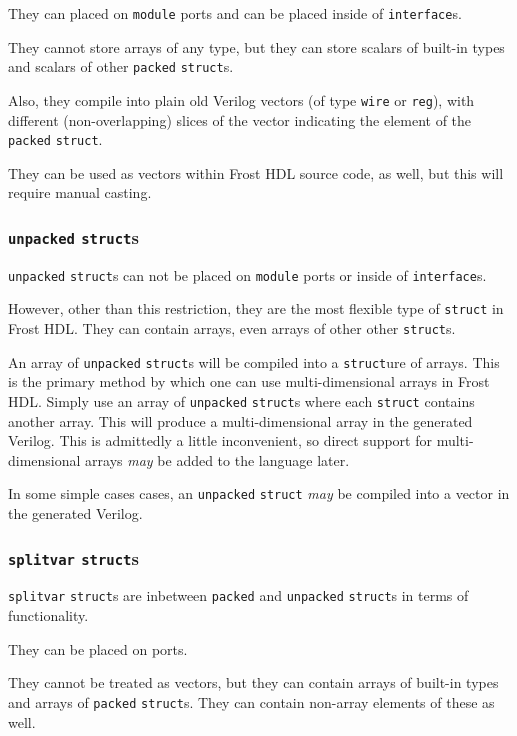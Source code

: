 \documentclass{article}
\begin{document}
	They can placed on \texttt{module} ports and can be placed inside of
	\texttt{interface}s.
	
	They cannot store arrays of any type, but they can store scalars of
	built-in types and scalars of other \texttt{packed} \texttt{struct}s.

	Also, they compile into plain old Verilog vectors (of type
	\texttt{wire} or \texttt{reg}), with different (non-overlapping) slices
	of the vector indicating the element of the \texttt{packed}
	\texttt{struct}.
	
	They can be used as vectors within Frost HDL source code, as well, but
	this will require manual casting.

	\subsubsection{\texttt{unpacked} \texttt{struct}s}
	\texttt{unpacked} \texttt{struct}s can not be placed on \texttt{module}
	ports or inside of \texttt{interface}s.

	However, other than this restriction, they are the most flexible type
	of \texttt{struct} in Frost HDL.  They can contain arrays, even arrays
	of other other \texttt{struct}s.

	An array of \texttt{unpacked} \texttt{struct}s will be compiled into a
	\texttt{struct}ure of arrays.  This is the primary method by which one
	can use multi-dimensional arrays in Frost HDL.  Simply use an array of
	\texttt{unpacked} \texttt{struct}s where each \texttt{struct} contains
	another array.  This will produce a multi-dimensional array in the
	generated Verilog.  This is admittedly a little inconvenient, so
	direct support for multi-dimensional arrays \textit{may} be added to
	the language later.

	In some simple cases cases, an \texttt{unpacked} \texttt{struct}
	\textit{may} be compiled into a vector in the generated Verilog.

	\subsubsection{\texttt{splitvar} \texttt{struct}s}
	\texttt{splitvar} \texttt{struct}s are inbetween \texttt{packed} and
	\texttt{unpacked} \texttt{struct}s in terms of functionality.

	They can be placed on ports.

	They cannot be treated as vectors, but they can contain arrays of
	built-in types and arrays of \texttt{packed} \texttt{struct}s.  They
	can contain non-array elements of these as well.
\end{document}
